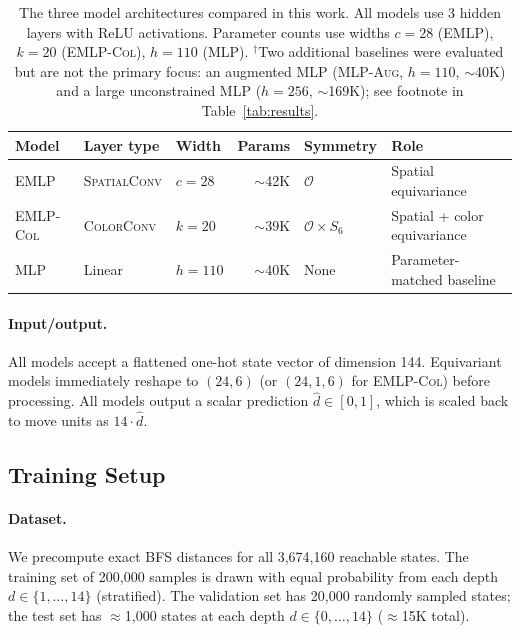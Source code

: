 \documentclass[11pt]{article}
\begin{document}
\begin{table}[h]
\centering
\caption{The three model architectures compared in this work.
All models use 3 hidden layers with ReLU activations.
Parameter counts use widths $c=28$ (\textsc{EMLP}), $k=20$ (\textsc{EMLP-Col}),
$h=110$ (\textsc{MLP}).
$^\dagger$Two additional baselines were evaluated but are not the primary focus:
an augmented \textsc{MLP} (\textsc{MLP-Aug}, $h=110$, ${\sim}$40K) and a large
unconstrained \textsc{MLP} ($h=256$, ${\sim}$169K); see footnote in
Table~\ref{tab:results}.}
\label{tab:models}
\renewcommand{\arraystretch}{1.2}
\begin{tabular}{lllrll}
\toprule
\textbf{Model} & \textbf{Layer type} & \textbf{Width} & \textbf{Params} &
  \textbf{Symmetry} & \textbf{Role} \\
\midrule
\textsc{EMLP}     & \textsc{SpatialConv}      & $c=28$ & $\sim$42K &
  $\mathcal{O}$             & Spatial equivariance \\
\textsc{EMLP-Col} & \textsc{ColorConv} & $k=20$ & $\sim$39K &
  $\mathcal{O} \times S_6$  & Spatial + color equivariance \\
\textsc{MLP}      & Linear                  & $h=110$& $\sim$40K &
  None                      & Parameter-matched baseline \\
\bottomrule
\end{tabular}
\end{table}

\paragraph{Input/output.}
All models accept a flattened one-hot state vector of dimension 144.
Equivariant models immediately reshape to $(24, 6)$ (or $(24, 1, 6)$ for
\textsc{EMLP-Col}) before processing.
All models output a scalar prediction $\hat{d} \in [0, 1]$, which is
scaled back to move units as $14 \cdot \hat{d}$.

\subsection{Training Setup}
\label{sec:training}

\paragraph{Dataset.}
We precompute exact BFS distances for all 3,674,160 reachable states.
The training set of 200,000 samples is drawn with equal probability from
each depth $d \in \{1, \ldots, 14\}$ (stratified).
The validation set has 20,000 randomly sampled states; the test set has
$\approx$1,000 states at each depth $d \in \{0, \ldots, 14\}$ ($\approx$15K
total).
\end{document}
